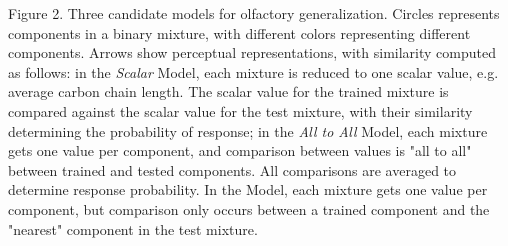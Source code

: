 Figure 2. Three candidate models for olfactory generalization.  Circles represents components in a binary mixture, with different colors representing different components.  Arrows show perceptual representations, with similarity computed as follows: in the \textit{Scalar} Model, each mixture is reduced to one scalar value, e.g. average carbon chain length.  The scalar value for the trained mixture is compared against the scalar value for the test mixture, with their similarity determining the probability of response; in the \textit{All to All} Model, each mixture gets one value per component, and comparison between values is "all to all" between trained and tested components.  All comparisons are averaged to determine response probability.  In the  Model, each mixture gets one value per component, but comparison only occurs between a trained component and the "nearest" component in the test mixture.  